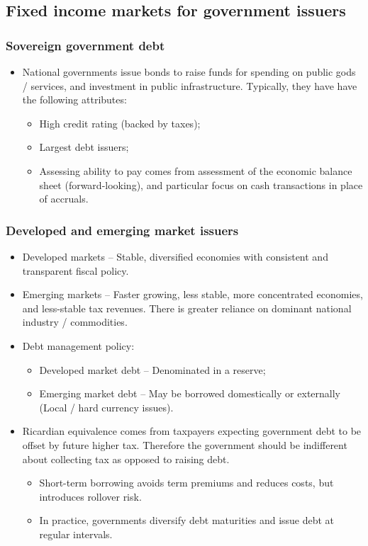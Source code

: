 \documentclass[../notes_compiled.tex]{subfiles}
\begin{document}
\subsection{Fixed income markets for government issuers}
\subsubsection{Sovereign government debt}
\begin{itemize}
\item National governments issue bonds to raise funds for spending on public gods / services, and investment in public infrastructure. Typically, they have have the following attributes:
\begin{itemize}
\item High credit rating (backed by taxes);
\item Largest debt issuers;
\item Assessing ability to pay comes from assessment of the economic balance sheet (forward-looking), and particular focus on cash transactions in place of accruals.
\end{itemize}
\end{itemize}
\subsubsection*{Developed and emerging market issuers}
\begin{itemize}
\item Developed markets -- Stable, diversified economies with consistent and transparent fiscal policy.
\item Emerging markets -- Faster growing, less stable, more concentrated economies, and less-stable tax revenues. There is greater reliance on dominant national industry / commodities.
\item Debt management policy:
\begin{itemize}
\item Developed market debt -- Denominated in a reserve;
\item Emerging market debt -- May be borrowed domestically or externally (Local / hard currency issues).
\end{itemize}
\item Ricardian equivalence comes from taxpayers expecting government debt to be offset by future higher tax. Therefore the government should be indifferent about collecting tax as opposed to raising debt.
\begin{itemize}
\item Short-term borrowing avoids term premiums and reduces costs, but introduces rollover risk.
\item In practice, governments diversify debt maturities and issue debt at regular intervals.
\end{itemize}
\end{itemize}
\end{document}
